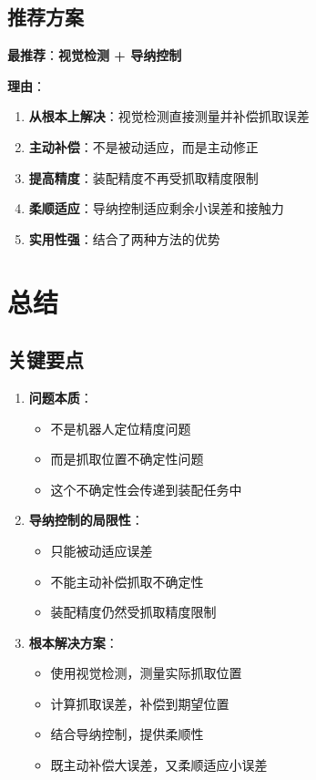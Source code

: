 \documentclass[12pt,a4paper]{article}
\begin{document}
\subsection{推荐方案}

\textbf{最推荐}：\textbf{视觉检测 + 导纳控制}

\textbf{理由}：
\begin{enumerate}
\item \textbf{从根本上解决}：视觉检测直接测量并补偿抓取误差
\item \textbf{主动补偿}：不是被动适应，而是主动修正
\item \textbf{提高精度}：装配精度不再受抓取精度限制
\item \textbf{柔顺适应}：导纳控制适应剩余小误差和接触力
\item \textbf{实用性强}：结合了两种方法的优势
\end{enumerate}

\section{总结}

\subsection{关键要点}

\begin{enumerate}
\item \textbf{问题本质}：
\begin{itemize}
\item 不是机器人定位精度问题
\item 而是抓取位置不确定性问题
\item 这个不确定性会传递到装配任务中
\end{itemize}

\item \textbf{导纳控制的局限性}：
\begin{itemize}
\item 只能被动适应误差
\item 不能主动补偿抓取不确定性
\item 装配精度仍然受抓取精度限制
\end{itemize}

\item \textbf{根本解决方案}：
\begin{itemize}
\item 使用视觉检测，测量实际抓取位置
\item 计算抓取误差，补偿到期望位置
\item 结合导纳控制，提供柔顺性
\item 既主动补偿大误差，又柔顺适应小误差
\end{itemize}
\end{enumerate}
\end{document}
